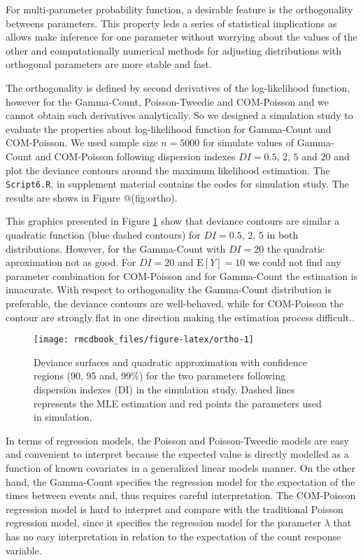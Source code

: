 \documentclass[9pt,a5paper,]{book}
\theoremstyle{definition}
\theoremstyle{definition}
\theoremstyle{remark}
\begin{document}
For multi-parameter probability function, a desirable feature is the
orthogonality betweens parameters. This property leds a series of
statistical implications as allows make inference for one parameter
without worrying about the values of the other and computationally
numerical methods for adjusting distributions with orthogonal parameters
are more stable and fast.

The orthogonality is defined by second derivatives of the log-likelihood
function, however for the Gamma-Count, Poisson-Tweedie and COM-Poisson
and we cannot obtain such derivatives analytically. So we designed a
simulation study to evaluate the properties about log-likelihood
function for Gamma-Count and COM-Poisson. We used sample size \(n=5000\)
for simulate values of Gamma-Count and COM-Poisson following dispersion
indexes \(DI=0.5\), \(2\), \(5\) and \(20\) and plot the deviance
contours around the maximum likelihood estimation. The
\texttt{Script6.R}, in supplement material contains the codes for
simulation study. The results are shows in Figure @(fig:ortho).

This graphics presented in Figure \ref{fig:ortho} show that deviance
contours are similar a quadratic function (blue dashed contours) for
\(DI=0.5\), \(2\), \(5\) in both distributions. However, for the
Gamma-Count with \(DI=20\) the quadratic aproximation not as good. For
\(DI=20\) and \(\mathrm{E}[Y]=10\) we could not find any parameter
combination for COM-Poisson and for Gamma-Count the estimation is
innacurate. With respect to orthogonality the Gamma-Count distribution
is preferable, the deviance contours are well-behaved, while for
COM-Poisson the contour are strongly flat in one direction making the
estimation process difficult..

\begin{figure}[h]

{\centering \texttt{[image: rmcdbook\_files/figure-latex/ortho-1]} 

}

\caption{Deviance surfaces and quadratic approximation with confidence regions (90, 95 and, 99\%) for the two parameters following dispersion indexes (DI) in the simulation study. Dashed lines represents the MLE estimation and red points the parameters used in simulation.}\label{fig:ortho}
\end{figure}

In terms of regression models, the Poisson and Poisson-Tweedie models
are easy and convenient to interpret because the expected value is
directly modelled as a function of known covariates in a generalized
linear models manner. On the other hand, the Gamma-Count specifies the
regression model for the expectation of the times between events and,
thus requires careful interpretation. The COM-Poisson regression model
is hard to interpret and compare with the traditional Poisson regression
model, since it specifies the regression model for the parameter
\(\lambda\) that has no easy interpretation in relation to the
expectation of the count response variable.
\end{document}
